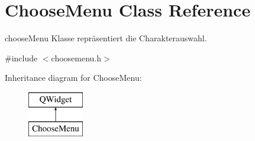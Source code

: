 \hypertarget{class_choose_menu}{}\section{Choose\+Menu Class Reference}
\label{class_choose_menu}


choose\+Menu Klasse repräsentiert die Charakterauswahl.  




{\ttfamily \#include $<$choosemenu.\+h$>$}

Inheritance diagram for Choose\+Menu\+:\begin{figure}[H]
\begin{center}
\leavevmode
\includegraphics[height=2.000000cm]{class_choose_menu}
\end{center}
\end{figure}
